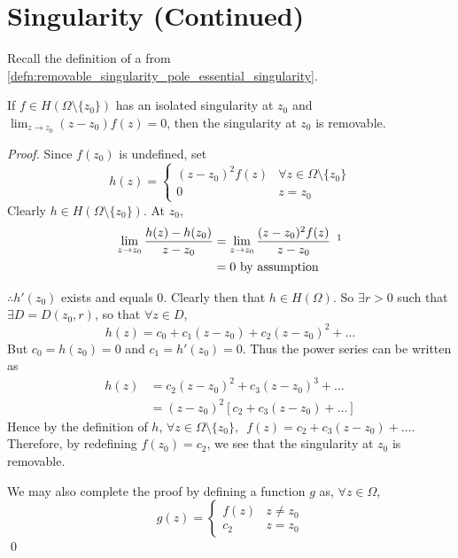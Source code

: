 \documentclass[notoc,notitlepage]{tufte-book}
\begin{document}
\section{Singularity (Continued)} %
\label{sec:singularity_continued}

Recall the definition of a  from \cref{defn:removable_singularity_pole_essential_singularity}.

\begin{thm}[Theorem 10]\label{thm:theorem_10}
	If $f \in H(\Omega \setminus \{z_0\})$ has an isolated singularity at $z_0$ and $\lim_{z \to z_0} (z - z_0) f(z) = 0$, then the singularity at $z_0$ is removable.
\end{thm}

\begin{proof}
	Since $f(z_0)$ is undefined, set
	\begin{equation*}
		h(z) = \begin{cases}
			(z - z_0)^2 f(z)	& \forall z \in \Omega \setminus \{z_0\} \\
			0					& z = z_0
		\end{cases}
	\end{equation*}
	Clearly $h \in H(\Omega \setminus \{z_0\})$. At $z_0$,
	\begin{align*}
		\lim_{z \to z_0} \frac{h(z) - h(z_0)}{z - z_0}
			&= \lim_{z \to z_0} \frac{(z - z_0)^2 f(z)}{z - z_0} \enspace \footnotemark \\
			&= 0 \text{ by assumption}
	\end{align*}


	$\therefore h'(z_0)$ exists and equals $0$. Clearly then that $h \in H(\Omega)$. So $\exists r > 0$ such that $\exists D = D(z_0, r)$, so that $\forall z \in D$,
	\begin{equation*}
		h(z) = c_0 + c_1 (z - z_0) + c_2 (z - z_0)^2 + \hdots
	\end{equation*}
	But $c_0 = h(z_0) = 0$ and $c_1 = h'(z_0) = 0$. Thus the power series can be written as
	\begin{align*}
		h(z) &= c_2 (z - z_0)^2 + c_3 (z - z_0)^3 + \hdots \\
			&= (z - z_0)^2 \left[ c_2 + c_3 (z - z_0) + \hdots \right]
	\end{align*}
	Hence by the definition of $h$, $\forall z \in \Omega \setminus \{z_0\}, \enspace f(z) = c_2 + c_3 (z - z_0) + \hdots$. Therefore, by redefining $f(z_0) = c_2$, we see that the singularity at $z_0$ is removable.

	We may also complete the proof by defining a function $g$ as, $\forall z \in \Omega$,
	\begin{equation*}
		g(z) = \begin{cases}
			f(z)		& z \neq z_0 \\
			c_2 		& z = z_0
		\end{cases}
	\end{equation*}\qed
\end{proof}
\end{document}
